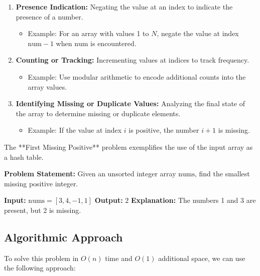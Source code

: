 \begin{enumerate}
    \item \textbf{Presence Indication:} Negating the value at an index to indicate the presence of a number.
        \begin{itemize}
            \item Example: For an array with values 1 to \( N \), negate the value at index \( \text{num} - 1 \) when \( \text{num} \) is encountered.
        \end{itemize}

    \item \textbf{Counting or Tracking:} Incrementing values at indices to track frequency.
        \begin{itemize}
            \item Example: Use modular arithmetic to encode additional counts into the array values.
        \end{itemize}

    \item \textbf{Identifying Missing or Duplicate Values:} Analyzing the final state of the array to determine missing or duplicate elements.
        \begin{itemize}
            \item Example: If the value at index \( i \) is positive, the number \( i+1 \) is missing.
        \end{itemize}
\end{enumerate}

\label{problem:first_missing_positive}
The **First Missing Positive** problem exemplifies the use of the input array as a hash table.

\textbf{Problem Statement:}  
Given an unsorted integer array \( \text{nums} \), find the smallest missing positive integer.

\textbf{Input:} \( \text{nums} = [3, 4, -1, 1] \)  
\textbf{Output:} \( 2 \)  
\textbf{Explanation:} The numbers 1 and 3 are present, but 2 is missing.

\subsection*{Algorithmic Approach}
To solve this problem in \( O(n) \) time and \( O(1) \) additional space, we can use the following approach:

